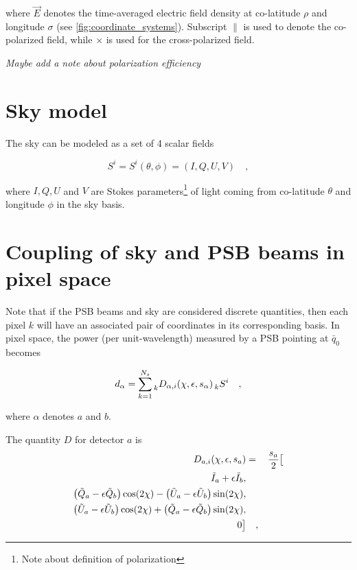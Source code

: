 \documentclass[11pt]{article}
\begin{document}
\noindent
where $\vec{E}$ denotes the time-averaged electric field density at co-latitude $\rho$ and longitude $\sigma$ (see \ref{fig:coordinate_systems}). 
Subscript $\parallel$ is used to denote the co-polarized field, while $\times$ is used for the cross-polarized field. 

\textsl{Maybe add a note about polarization efficiency}

\section{Sky model}

The sky can be modeled as a set of 4 scalar fields

\begin{equation}
	S^i = S^i(\theta, \phi) = (I, Q, U, V) \quad ,
\end{equation}

\noindent
where $I, Q, U$ and $V$ are Stokes parameters\footnote{Note about definition of polarization} of light coming from co-latitude $\theta$
and longitude $\phi$ in the sky basis. 

\section{Coupling of sky and PSB beams in pixel space}

Note that if the PSB beams and sky are considered discrete quantities, then each pixel $k$ will have an associated pair of coordinates in its corresponding basis. 
In pixel space, the power (per unit-wavelength) measured by a PSB pointing at $\bar{q}_0$ becomes

\begin{equation}
\label{eq:coupling}
	d_{\alpha} = \sum^{N_s}_{k=1} \prescript{}{k}{ D_{\alpha,i}(\chi, \epsilon, s_{\alpha})} \prescript{}{k}{S^{i}} \quad ,
\end{equation}
 
\noindent
where $\alpha$ denotes $a$ and $b$.

The quantity $D$ for detector $a$ is 
\begin{equation}
\begin{aligned}
D_{a, i}(\chi, \epsilon, s_a) &=& \frac{s_a}{2} \big{[} \\
 \tilde{I}_{a} + \epsilon \tilde{I}_{b} , \\
\left(\tilde{Q}_{a} - \epsilon \tilde{Q}_{b} \right) \cos(2 \chi) - \left(\tilde{U}_{a} - \epsilon \tilde{U}_{b} \right) \sin(2 \chi) , \\
\left(\tilde{U}_{a} - \epsilon \tilde{U}_{b} \right) \cos(2 \chi) + \left(\tilde{Q}_{a} - \epsilon \tilde{Q}_{b} \right) \sin(2 \chi) , \\
0 \big{]} & \quad ,
\end{aligned}
\end{equation}
\end{document}
